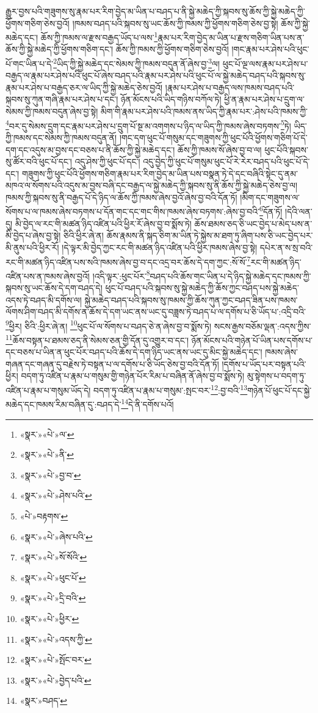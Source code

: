 རྒྱུར་བྱས་པའི་གཟུགས་སུ་རྣམ་པར་རིག་བྱེད་མ་ཡིན་པ་བཤད་པ་ནི་སྐྱེ་མཆེད་ཀྱི་སྐབས་སུ་ཆོས་ཀྱི་སྐྱེ་མཆེད་ཀྱི་ཕྱོགས་གཅིག་ཅེས་བྱའོ། །ཁམས་བཤད་པའི་སྐབས་སུ་ཡང་ཆོས་ཀྱི་ཁམས་ཀྱི་ཕྱོགས་གཅིག་ཅེས་བྱ་སྟེ། ཆོས་ཀྱི་སྐྱེ་མཆེད་དང་། ཆོས་ཀྱི་ཁམས་ལ་རྫས་བརྒྱད་ཡོད་པ་ལས་\footnote{«སྣར་»«པེ་»ལ་}རྣམ་པར་རིག་བྱེད་མ་ཡིན་པ་རྫས་གཅིག་ཡིན་པས་ན་ཆོས་ཀྱི་སྐྱེ་མཆེད་ཀྱི་ཕྱོགས་གཅིག་དང་། ཆོས་ཀྱི་ཁམས་ཀྱི་ཕྱོགས་གཅིག་ཅེས་བྱའོ། །གང་རྣམ་པར་ཤེས་པའི་ཕུང་པོ་གང་ཡིན་པ་དེ་\footnote{«སྣར་»«པེ་»ནི་}ཡིད་ཀྱི་སྐྱེ་མཆེད་དང་སེམས་ཀྱི་ཁམས་བདུན་ནོ་ཞེས་བྱ་\footnote{«སྣར་»«པེ་»བྱ་བ་}ལ། ཕུང་པོ་ལྔ་ལས་རྣམ་པར་ཤེས་པ་བརྒྱད་ལ་རྣམ་པར་ཤེས་པའི་ཕུང་པོ་ཞེས་བཤད་པའི་རྣམ་པར་ཤེས་པའི་ཕུང་པོ་ལ་སྐྱེ་མཆེད་བཤད་པའི་སྐབས་སུ་རྣམ་པར་ཤེས་པ་བརྒྱད་ཅར་ལ་ཡིད་ཀྱི་སྐྱེ་མཆེད་ཅེས་བྱའོ། །རྣམ་པར་ཤེས་པ་བརྒྱད་ལས་ཁམས་བཤད་པའི་སྐབས་སུ་ཀུན་གཞི་རྣམ་པར་ཤེས་པ་དང་། ཉོན་མོངས་པའི་ཡིད་གཉིས་བཀོལ་ཏེ། ཕྱི་ན་རྣམ་པར་ཤེས་པ་དྲུག་ལ་སེམས་ཀྱི་ཁམས་བདུན་ཞེས་བྱ་སྟེ། མིག་གི་རྣམ་པར་ཤེས་པའི་ཁམས་ནས་ཡིད་ཀྱི་རྣམ་པར་:ཤེས་པའི་ཁམས་ཀྱི་\footnote{«སྣར་»«པེ་»ཤེས་པའི་}བར་དུ་སེམས་དྲུག་དང་རྣམ་པར་ཤེས་པ་དྲུག་པོ་སྔ་མ་འགགས་པ་ཉིད་ལ་ཡིད་ཀྱི་ཁམས་ཞེས་བཏགས་\footnote{«པེ་»བརྟགས་}ཏེ། ཡིད་ཀྱི་ཁམས་དང་སེམས་ཀྱི་ཁམས་བདུན་ནོ། །གང་དག་ཕུང་པོ་གསུམ་དང་གཟུགས་ཀྱི་ཕུང་པོའི་ཕྱོགས་གཅིག་པོ་དེ་དག་དང་འདུས་མ་བྱས་དང་བཅས་པ་ནི་ཆོས་ཀྱི་སྐྱེ་མཆེད་དང་། ཆོས་ཀྱི་ཁམས་སོ་ཞེས་བྱ་བ་ལ། ཕུང་པོའི་སྐབས་སུ་ཚོར་བའི་ཕུང་པོ་དང་། འདུ་ཤེས་ཀྱི་ཕུང་པོ་དང་། འདུ་བྱེད་ཀྱི་ཕུང་པོ་གསུམ་ཕུང་པོ་རེ་རེར་བཤད་པའི་ཕུང་པོ་དེ་དང་། གཟུགས་ཀྱི་ཕུང་པོའི་ཕྱོགས་གཅིག་རྣམ་པར་རིག་བྱེད་མ་ཡིན་པས་བསྣན་ཏེ་དེ་དང་བཞིའི་སྟེང་དུ་ནམ་མཁའ་ལ་སོགས་པའི་འདུས་མ་བྱས་བཞི་དང་བརྒྱད་ལ་སྐྱེ་མཆེད་ཀྱི་སྐབས་སུ་ནི་ཆོས་ཀྱི་སྐྱེ་མཆེད་ཅེས་བྱ་ལ། ཁམས་ཀྱི་སྐབས་སུ་ནི་བརྒྱད་པོ་དེ་ཉིད་ལ་ཆོས་ཀྱི་ཁམས་ཞེས་བྱའོ་ཞེས་བྱ་བའི་དོན་ཏོ། །མིག་དང་གཟུགས་ལ་སོགས་པ་ལ་ཁམས་ཞེས་བཏགས་པ་དོན་གང་དང་གང་གིས་ཁམས་ཞེས་བཏགས་:ཞེས་བྱ་བའི་\footnote{«སྣར་»«པེ་»ཞེས་པའི་}དོན་ཏོ། །དེའི་ལན་དུ། མི་བྱེད་ལ་རང་གི་མཚན་ཉིད་འཛིན་པའི་ཕྱིར་རོ་ཞེས་བྱ་བ་སྨོས་ཏེ། ཆོས་ཐམས་ཅད་ཅི་ཡང་བྱེད་པ་མེད་པས་ན་མི་བྱེད་པ་ཞེས་བྱ་སྟེ། ཅིའི་ཕྱིར་ཞེ་ན། ཆོས་རྣམས་ནི་སྐད་ཅིག་མ་ཡིན་ཏེ་སྐྱེས་མ་ཐག་ཏུ་ཞིག་པས་ཅི་ཡང་བྱེད་པར་མི་ནུས་པའི་ཕྱིར་རོ། །དེ་ལྟར་མི་བྱེད་ཀྱང་རང་གི་མཚན་ཉིད་འཛིན་པའི་ཕྱིར་ཁམས་ཞེས་བྱ་སྟེ། དཔེར་ན་ས་སྲ་བའི་རང་གི་མཚན་ཉིད་འཛིན་པས་སའི་ཁམས་ཞེས་བྱ་བ་དང་འདྲ་བར་ཆོས་དེ་དག་ཀྱང་:སོ་སོ་\footnote{«སྣར་»«པེ་»སོ་སོའི་}རང་གི་མཚན་ཉིད་འཛིན་པས་ན་ཁམས་ཞེས་བྱའོ། །འདི་ལྟར་:ཕུང་པོར་\footnote{«སྣར་»«པེ་»ཕུང་པོ་}བཤད་པའི་ཆོས་གང་ཡིན་པ་དེ་ཉིད་སྐྱེ་མཆེད་དང་ཁམས་ཀྱི་སྐབས་སུ་ཡང་ཆོས་དེ་དག་བཤད་དེ། ཕུང་པོ་བཤད་པའི་སྐབས་སུ་སྐྱེ་མཆེད་ཀྱི་ཆོས་ཀྱང་བཤད་པས་སྐྱེ་མཆེད་འདས་ཏེ་བཤད་མི་དགོས་ལ། སྐྱེ་མཆེད་བཤད་པའི་སྐབས་སུ་ཁམས་ཀྱི་ཆོས་ཀུན་ཀྱང་བཤད་ཟིན་པས་ཁམས་ལོགས་ཤིག་བཤད་མི་དགོས་ན་ཆོས་དེ་དག་ཡང་ནས་ཡང་དུ་བཟླས་ཏེ་བཤད་པ་ལ་དགོས་པ་ཅི་ཡོད་པ་:འདྲི་བའི་\footnote{«སྣར་»«པེ་»དྲི་བའི་}ཕྱིར། ཅིའི་:ཕྱིར་ཞེ་ན། \footnote{«སྣར་»«པེ་»ཕྱིར་}ཕུང་པོ་ལ་སོགས་པ་བཤད་ཅེ་ན་ཞེས་བྱ་བ་སྨོས་ཏེ། སངས་རྒྱས་བཅོམ་ལྡན་:འདས་ཀྱིས་\footnote{«སྣར་»«པེ་»འདས་ཀྱི་}ཆོས་བསྟན་པ་ཐམས་ཅད་ནི་སེམས་ཅན་གྱི་དོན་དུ་འགྱུར་བ་དང་། ཉོན་མོངས་པའི་གཉེན་པོ་ཡིན་པས་དགོས་པ་དང་བཅས་པ་ཡིན་ན་ཕུང་པོར་བཤད་པའི་ཆོས་དེ་དག་ཉིད་ཡང་ནས་ཡང་དུ་མིང་སྐྱེ་མཆེད་དང་། ཁམས་ཞེས་གཞན་དང་གཞན་དུ་བརྗེས་ཏེ་བསྟན་པ་ལ་དགོས་པ་ཅི་ཡོད་ཅེས་བྱ་བའི་དོན་ཏོ། །དགོས་པ་ཡོད་པར་བསྟན་པའི་ཕྱིར། བདག་ཏུ་འཛིན་པ་རྣམ་པ་གསུམ་གྱི་གཉེན་པོར་རིམ་པ་བཞིན་ནོ་ཞེས་བྱ་བ་སྨོས་ཏེ། མུ་སྟེགས་པ་བདག་ཏུ་འཛིན་པ་རྣམ་པ་གསུམ་ཡོད་དེ། བདག་ཏུ་འཛིན་པ་རྣམ་པ་གསུམ་:སྤང་བར་\footnote{«སྣར་»«པེ་»སྤོང་བར་}:བྱ་བའི་\footnote{«སྣར་»«པེ་»བྱེད་པའི་}གཉེན་པོ་ཕུང་པོ་དང་སྐྱེ་མཆེད་དང་ཁམས་རིམ་བཞིན་དུ་:བཤད་དེ་\footnote{«སྣར་»བཤད་}དེ་ནི་དགོས་པའོ། 